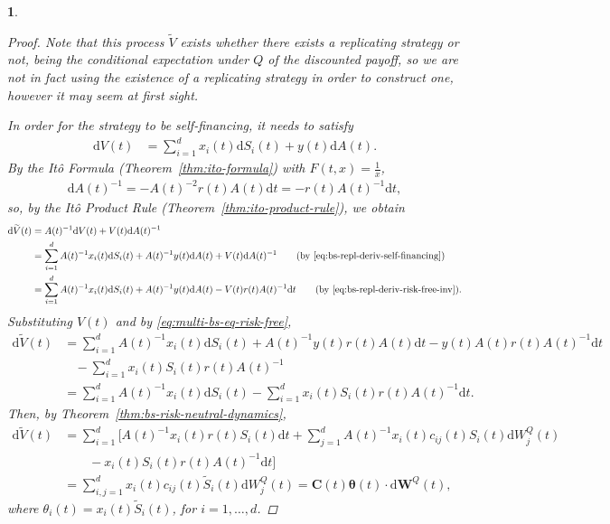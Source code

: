 \documentclass[english]{article}
\numberwithin{equation}{section}
\numberwithin{figure}{section}
\theoremstyle{bolddescit}
\newtheorem{theorem}{\protect\theoremname}[section]
\theoremstyle{definition}
\theoremstyle{definition}
\theoremstyle{plain}
\theoremstyle{plain}
\theoremstyle{bolddesc}
\theoremstyle{plain}
\theoremstyle{remark}
\providecommand{\theoremname}{Theorem}
\begin{document}
\begin{theorem}
\begin{proof}
    Note that this process $\widetilde{V}$ exists whether there exists a replicating strategy or not, being the conditional expectation under $Q$ of the discounted payoff, so we are not in fact using the existence of a replicating strategy in order to construct one, however it may seem at first sight.

    In order for the strategy to be self-financing, it needs to satisfy
    \begin{align}\label{eq:bs-repl-deriv-self-financing}
      \mathrm{d}V(t) &= \sum_{i=1}^d x_i(t) \mathrm{d}S_i(t) + y(t) \mathrm{d}A(t).
    \end{align}
    By the It\^o Formula (Theorem~\ref{thm:ito-formula}) with $F(t,x) = \frac{1}{x}$,
    \begin{align}\label{eq:bs-repl-deriv-risk-free-inv}
      \mathrm{d}A(t)^{-1} = -A(t)^{-2} r(t) A(t) \mathrm{d}t = - r(t) A(t)^{-1} \mathrm{d}t,
    \end{align}
    so, by the It\^o Product Rule (Theorem~\ref{thm:ito-product-rule}), we obtain
    \begin{align*}
      \mathrm{d}\widetilde{V}(t)
      &= A(t)^{-1} \mathrm{d}V(t) + V(t) \mathrm{d}A(t)^{-1}\\
      &= \sum_{i=1}^d A(t)^{-1} x_i(t) \mathrm{d}S_i(t) + A(t)^{-1} y(t) \mathrm{d}A(t) + V(t) \mathrm{d}A(t)^{-1}\tag{by \eqref{eq:bs-repl-deriv-self-financing}}\\
      &= \sum_{i=1}^d A(t)^{-1} x_i(t) \mathrm{d}S_i(t) + A(t)^{-1} y(t) \mathrm{d}A(t) - V(t) r(t) A(t)^{-1} \mathrm{d}t \tag{by \eqref{eq:bs-repl-deriv-risk-free-inv}}.
    \end{align*}
    Substituting $V(t)$ and by \eqref{eq:multi-bs-eq-risk-free},
    \begin{align*}
      \mathrm{d}\widetilde{V}(t)
      &= \sum_{i=1}^d A(t)^{-1} x_i(t) \mathrm{d}S_i(t) + A(t)^{-1} y(t) r(t) A(t) \mathrm{d}t - y(t) A(t) r(t) A(t)^{-1} \mathrm{d}t\\
        &\ \ \ \ - \sum_{i=1}^d x_i(t) S_i(t) r(t) A(t)^{-1}\\
      &= \sum_{i=1}^d A(t)^{-1} x_i(t) \mathrm{d}S_i(t) - \sum_{i=1}^d x_i(t) S_i(t) r(t) A(t)^{-1} \mathrm{d}t.
    \end{align*}
    Then, by Theorem~\ref{thm:bs-risk-neutral-dynamics},
    \begin{align*}
      \mathrm{d}\widetilde{V}(t)
      &= \sum_{i=1}^d \Big[ A(t)^{-1} x_i(t) r(t) S_i(t) \mathrm{d}t + \sum_{j=1}^d A(t)^{-1} x_i(t) c_{ij}(t) S_i(t) \mathrm{d}W^Q_j(t) \\
        &\ \ \ \ \ \ \ \ \ - x_i(t) S_i(t) r(t) A(t)^{-1} \mathrm{d}t \Big]\\
      &= \sum_{i,j=1}^d x_i(t) c_{ij}(t) \widetilde{S}_i(t) \mathrm{d}W^Q_j(t)
      = \mathbf{C}(t) \mathbf{\theta}(t) \cdot \mathrm{d}\mathbf{W}^Q(t),
    \end{align*}
    where $\theta_i(t) = x_i(t) \widetilde{S}_i(t)$, for $i=1,\ldots,d$.


\end{proof}
\end{theorem}
\end{document}
